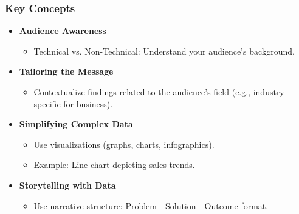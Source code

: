 \documentclass[aspectratio=169]{beamer}
\begin{document}
\begin{frame}[fragile]
    \frametitle{Key Concepts}
    \begin{itemize}
        \item \textbf{Audience Awareness}
        \begin{itemize}
            \item Technical vs. Non-Technical: Understand your audience's background.
        \end{itemize}
        
        \item \textbf{Tailoring the Message}
        \begin{itemize}
            \item Contextualize findings related to the audience's field (e.g., industry-specific for business).
        \end{itemize}
        
        \item \textbf{Simplifying Complex Data}
        \begin{itemize}
            \item Use visualizations (graphs, charts, infographics).
            \item Example: Line chart depicting sales trends.
        \end{itemize}
        
        \item \textbf{Storytelling with Data}
        \begin{itemize}
            \item Use narrative structure: Problem - Solution - Outcome format.
        \end{itemize}
    \end{itemize}
\end{frame}
\end{document}
